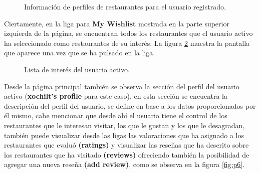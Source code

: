\documentclass[12pt,letterpaper,oneside] {memoir}
\begin{document}
\begin{figure}[H]
\centering 
{} \caption{Información de perfiles de restaurantes para el usuario registrado.} 
\label{fig:p4} 
\end{figure}

Ciertamente, en la liga para \textbf{My Wishlist} mostrada en la parte superior izquierda de la página, se encuentran todos los restaurantes que el usuario activo ha seleccionado como restaurantes de su interés. La figura \ref{fig:p5} muestra la pantalla que aparece una vez que se ha pulsado en la liga.\\

\begin{figure}[H]
\centering 
{} \caption{Lista de interés del usuario activo.} 
\label{fig:p5} 
\end{figure}

Desde la página principal también se observa la sección del perfil del usuario activo (\textbf{xochilt’s profile} para este caso), en esta sección se encuentra la descripción del perfil del usuario, se define en base a los datos proporcionados por él mismo, cabe mencionar que desde ahí el usuario tiene el control de los restaurantes que le interesan visitar, los que le gustan y los que le desagradan, también puede visualizar desde las ligas las valoraciones que ha asignado a los restaurantes que evaluó \textbf{(ratings)} y visualizar las reseñas que ha descrito sobre los restaurantes que ha visitado \textbf{(reviews)} ofreciendo también la posibilidad de agregar una nueva reseña \textbf{(add review)}, como se observa en la figura \ref{fig:p6}.
\end{document}
